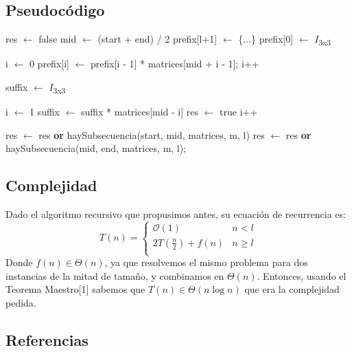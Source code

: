 \subsection{Pseudocódigo}

\begin{algorithmic}


    \State {}
  \EndIf

    \State {}
  \EndIf
    
  \State 
  
  \State res $\gets$ false
  \State mid $\gets$ (start + end) / 2
  \State prefix[l+1] $\gets$ \{...\}
  \State prefix[0] $\gets$ $I$\textsubscript{3x3}
  
  \State 
  
  \State i $\gets$ 0
    \State prefix[i] $\gets$ prefix[i - 1] * matrices[mid + i - 1];
    \State i++
  \EndWhile
  
  \State
  \State suffix $\gets$ $I$\textsubscript{3x3}
  \State
  
  \State i $\gets$ 1
    \State suffix $\gets$ suffix * matrices[mid - i]
      \State res $\gets$ true
    \EndIf
    \State i++
  \EndWhile
  
  \State
  
  \State res $\gets$ res \textbf{or} haySubsecuencia(start, mid, matrices, m, l)
  \State res $\gets$ res \textbf{or} haySubsecuencia(mid, end, matrices, m, l);
  
  
\EndFunction

\end{algorithmic}


\subsection{Complejidad}
Dado el algoritmo recursivo que propusimos antes, su ecuación de recurrencia es:
\newline
 \[ T(n) =  \begin{cases} 
      \mathcal{O}(1) & n < l \\
      2 T(\frac{n}{2}) + f(n) & n \geq l \\ 
   \end{cases}
 \]
 Donde $f(n) \in \Theta(n)$, ya que resolvemos el mismo problema para dos instancias de la mitad de tamaño, y combinamos
en $\Theta(n)$. Entonces, usando el Teorema Maestro[1] sabemos que
$T(n) \in \Theta(n\log{}n)$ que era la complejidad pedida.

\subsection{Referencias}
